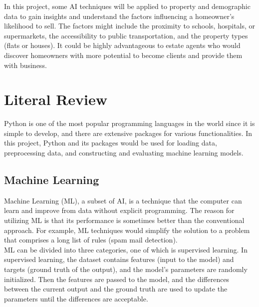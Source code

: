 \documentclass[12pt,twoside]{report}
\begin{document}
In this project, some AI techniques will be applied to property and demographic data to gain insights and understand the factors influencing a homeowner's likelihood to sell. The factors might include the proximity to schools, hospitals, or supermarkets, the accessibility to public transportation, and the property types (flats or houses). It could be highly advantageous to estate agents who would discover homeowners with more potential to become clients and provide them with business. 

\chapter{Literal Review}
Python is one of the most popular programming languages in the world since it is simple to develop, and there are extensive packages for various functionalities. In this project, Python and its packages would be used for loading data, preprocessing data, and constructing and evaluating machine learning models. 

\section{Machine Learning}
Machine Learning (ML), a subset of AI, is a technique that the computer can learn and improve from data without explicit programming. The reason for utilizing ML is that its performance is sometimes better than the conventional approach. For example, ML techniques would simplify the solution to a problem that comprises a long list of rules (spam mail detection). 
\\

ML can be divided into three categories, one of which is supervised learning. In supervised learning, the dataset contains features (input to the model) and targets (ground truth of the output), and the model's parameters are randomly initialized. Then the features are passed to the model, and the differences between the current output and the ground truth are used to update the parameters until the differences are acceptable. 
\\
\end{document}
